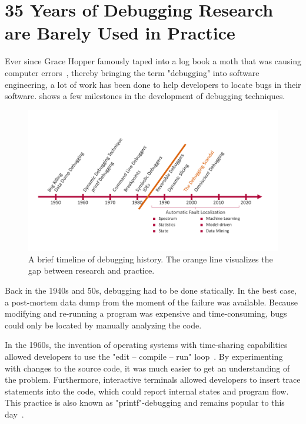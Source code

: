 
\section{35 Years of Debugging Research are Barely Used in Practice}

Ever since Grace Hopper famously taped into a log book a moth that was causing computer errors~\cite{hopper47:log_book_with_computer}, thereby bringing the term "debugging" into software engineering, a lot of work has been done to help developers to locate bugs in their software.
 shows a few milestones in the development of debugging techniques.


\begin{figure}[t]
\centering
\includegraphics[width=\linewidth]{img/debugging-timeline}
\caption{A brief timeline of debugging history. The orange line visualizes the gap between research and practice.}
\label{fig:debugging-timeline}
\end{figure}

Back in the 1940s and 50s, debugging had to be done statically.
In the best case, a post-mortem data dump from the moment of the failure was available.
Because modifying and re-running a program was expensive and time-consuming, bugs could only be located by manually analyzing the code.

\newpage
In the 1960s, the invention of operating systems with time-sharing capabilities allowed developers to use the "edit -- compile -- run" loop~\cite{linton90:the_evolution_of_dbx}.
By experimenting with changes to the source code, it was much easier to get an understanding of the problem.
Furthermore, interactive terminals allowed developers to insert trace statements into the code, which could report internal states and program flow.
This practice is also known as "printf"-debugging and remains popular to this day~\cite{perscheid17:studying_the_advancement}.

